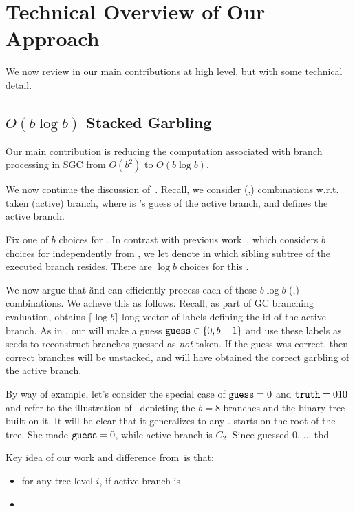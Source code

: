 
\section{Technical Overview of Our Approach}
\label{sec:techOverview}

We  now review in  our main contributions at high level, but with some technical detail.
\subsection{$O(b\log b)$ Stacked Garbling}
\label{sec:techOverviewSG}

Our main contribution is reducing the computation associated with branch processing in SGC from $O(b^2)$ to $O(b \log b)$.

We now continue the discussion of~.  
Recall, we consider (\truth,\guess) combinations w.r.t. taken (active) branch, where \guess is \E's guess of the active branch, and \truth defines the active branch.

Fix one of $b$ choices for \guess.  In contrast with previous work~\HK, which considers $b$ choices for \truth independently from \guess, we let \truth  denote in which sibling subtree of \guess the executed branch resides.  There are $\log b$ choices for this \truth.  

We now argue that \G and \E can efficiently process each of these $b\log b$  (\truth,\guess) combinations.   We acheve this as follows.  Recall, as part of GC branching evaluation, \E obtains $\lceil \log b \rceil$-long vector of labels defining the id of the active branch. As in \HK, our \E will make a guess $\mathtt{guess}\in\{0,b-1\}$ and use these labels as seeds to reconstruct branches guessed as {\em not} taken.  If the guess was correct, then correct branches will be unstacked, and \E will have obtained the correct garbling of the active branch. 



By way of example, let's consider the special case of $\mathtt{guess}=0$ and $\mathtt{truth} = 010$ and refer to the illustration of~ depicting the $b=8$ branches and the binary tree built on it.  It will be clear that it generalizes to any \guess.  \E starts on the root of the tree.  She made $\mathtt{guess} = 0$, while active branch is $C_2$.  Since \E guessed $0$, ... tbd



 Key idea of our work and difference from~\HK is that:
\begin{itemize}
	\item for any tree level $i$, if active branch is 
	\item 
\end{itemize}




